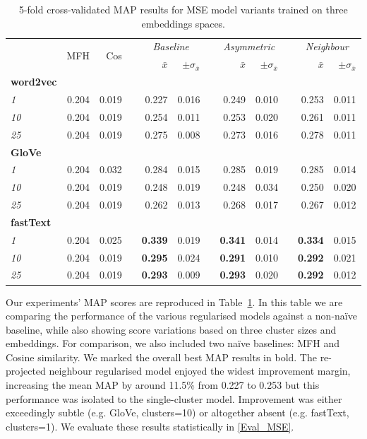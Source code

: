 \begin{table}\centering
\begin{tabular}{@{}lrrcrrcrrcrr@{}}\toprule
& \multirow{2}{*}{MFH} & \multirow{2}{*}{Cos} & \phantom{a} &  \multicolumn{2}{c}{\textit{Baseline}} & \phantom{a} & \multicolumn{2}{c}{\textit{Asymmetric}} & \phantom{a} & \multicolumn{2}{c}{\textit{Neighbour}}\\
\cmidrule{5-6} \cmidrule{8-9} \cmidrule{11-12}
&  &  && $\bar{x}$ & $\pm\sigma_{\bar{x}}$ && $\bar{x}$ & $\pm\sigma_{\bar{x}}$ && $\bar{x}$ & $\pm\sigma_{\bar{x}}$ \\ \midrule
\textbf{word2vec}\\
\textit{1} & 0.204 & 0.019 && 0.227 & 0.016 && 0.249 & 0.010 && 0.253 & 0.011 \\
\textit{10} & 0.204 & 0.019 && 0.254 & 0.011 && 0.253 & 0.020 && 0.261 & 0.011 \\
\textit{25} & 0.204 & 0.019 && 0.275 & 0.008 && 0.273 & 0.016 && 0.278 & 0.011 \\
\cmidrule{2-12}
\textbf{GloVe}\\
\textit{1} & 0.204 & 0.032 && 0.284 & 0.015 && 0.285 & 0.019 && 0.285 & 0.014 \\
\textit{10} & 0.204 & 0.019 && 0.248 & 0.019 && 0.248 & 0.034 && 0.250 & 0.020 \\
\textit{25} & 0.204 & 0.019 && 0.262 & 0.013 && 0.268 & 0.017 && 0.267 & 0.012 \\
\cmidrule{2-12}
\textbf{fastText}\\
\textit{1} & 0.204 & 0.025 && \textbf{0.339} & 0.019 && \textbf{0.341} & 0.014 && \textbf{0.334} & 0.015 \\
\textit{10} & 0.204 & 0.019 && \textbf{0.295} & 0.024 && \textbf{0.291} & 0.010 && \textbf{0.292} & 0.021 \\
\textit{25} & 0.204 & 0.019 && \textbf{0.293} & 0.009 && \textbf{0.293} & 0.020 && \textbf{0.292} & 0.012 \\
\bottomrule
\end{tabular}
\caption{5-fold cross-validated \ac{MAP} results for \ac{MSE} model variants trained on three embeddings spaces.}\label{tab:map_mse}
\end{table}
Our experiments' \ac{MAP} scores are reproduced in Table~\ref{tab:map_mse}.  In this table we are comparing the performance of the various regularised models against a non-na\"ive baseline, while also showing score variations based on three cluster sizes and embeddings.  For comparison, we also included two na\"ive baselines: MFH and Cosine similarity.  We marked the overall best \ac{MAP} results in bold.  The re-projected neighbour regularised model enjoyed the widest improvement margin, increasing the mean \ac{MAP} by around 11.5\% from 0.227 to 0.253 but this performance was isolated to the single-cluster model.  Improvement was either exceedingly subtle (e.g. GloVe, clusters=10) or altogether absent (e.g. fastText, clusters=1).  We evaluate these results statistically in \cref{Eval_MSE}.

